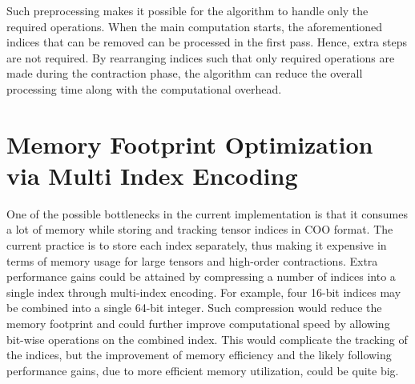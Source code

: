 \noindent
Such preprocessing makes it possible for the algorithm to handle only the required operations.
When the main computation starts, the aforementioned indices that can be removed can be
processed in the first pass. Hence, extra steps are not required. By rearranging indices
such that only required operations are made during the contraction phase, the algorithm can
reduce the overall processing time along with the computational overhead.

\section{Memory Footprint Optimization via Multi Index Encoding}
One of the possible bottlenecks in the current implementation is that it consumes a lot of
memory while storing and tracking tensor indices in COO format. The current practice is to
store each index separately, thus making it expensive in terms of memory usage for large
tensors and high-order contractions. Extra performance gains could be attained by compressing
a number of indices into a single index through multi-index encoding. For example, four
16-bit indices may be combined into a single 64-bit integer. Such compression would reduce
the memory footprint and could further improve computational speed by allowing bit-wise
operations on the combined index. This would complicate the tracking of the indices, but the
improvement of memory efficiency and the likely following performance gains, due to more efficient
memory utilization, could be quite big.